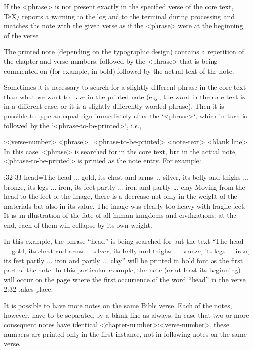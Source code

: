 {If the <phrase> is not present exactly in the specified verse of the core text,
\TeX/ reports a warning to the log and to the terminal during processing and
matches the note with the given verse as if the <phrase> were at the beginning of the verse.

The printed note (depending on the typographic design) contains
a repetition of the chapter and verse numbers, followed by the <phrase> that is being commented on
(for example, in bold) followed by the actual text of the note.

Sometimes it is necessary to search for a slightly different phrase in the core text than what
we want to have in the printed note (e.g., the word in the core text is in
a different case, or it is a slightly differently worded phrase). Then it is possible to type an equal sign immediately after the `{<phrase>}`, which in turn is followed by the  `{<phrase-to-be-printed>}`, i.e.,

\begtt
{}:<verse-number> {<phrase>}={<phrase-to-be-printed>} <note-text>
<blank line>
\endtt
In this case, <phrase> is searched for in the core text, but in the actual
note, <phrase-to-be-printed> is printed as the note entry. For example:

\begtt
{}:32-33 {head}={The head ... gold, its chest and arms ... silver, its belly and thighs ... bronze, its legs ... iron, its feet partly ... iron and partly ... clay} 
Moving from the head to the feet of the image, there is a decrease not only in the  weight of the materials but also in its value. The image was clearly too heavy with fragile feet. It is an illustration of the fate of all human kingdoms and civilizations:  at the end, each of them will collapse by its own weight.
\endtt

In this example, the phrase “head” is being searched for but the text “The head ... gold, its chest and arms ... silver, its belly and thighs ... 
bronze, its legs ... iron, its feet partly ... iron and partly ... clay” will be printed in bold font as the first part of the note.
In this particular example, the note (or at least its beginning) will occur on the page where the first occurrence of the word “head” in the verse 2:32 takes place.

It is  possible to have more notes on the same Bible verse. Each of the notes, however, have to be separated by a blank line as always. 
In case that two or more consequent notes have identical <chapter-number>:<verse-number>, these numbers are printed only in the first instance, not in following notes on the same verse.

}
